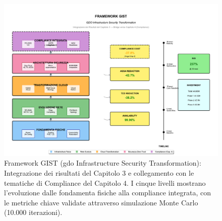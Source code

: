 \begin{figure}[htbp]
\centering
\includegraphics[width=\textwidth]{thesis_figures/cap3/figura_3_6_framework_integrato.pdf}
\caption{Framework GIST (\gls{gdo} Infrastructure Security Transformation): Integrazione dei risultati del Capitolo 3 e collegamento con le tematiche di Compliance del Capitolo 4. I cinque livelli mostrano l'evoluzione dalle fondamenta fisiche alla compliance integrata, con le metriche chiave validate attraverso simulazione Monte Carlo (10.000 iterazioni).}
\label{fig:framework_gist}
\end{figure}

\clearpage
\printbibliography[
    heading=subbibliography,
    title={Riferimenti Bibliografici del Capitolo 3},
]


\clearpage